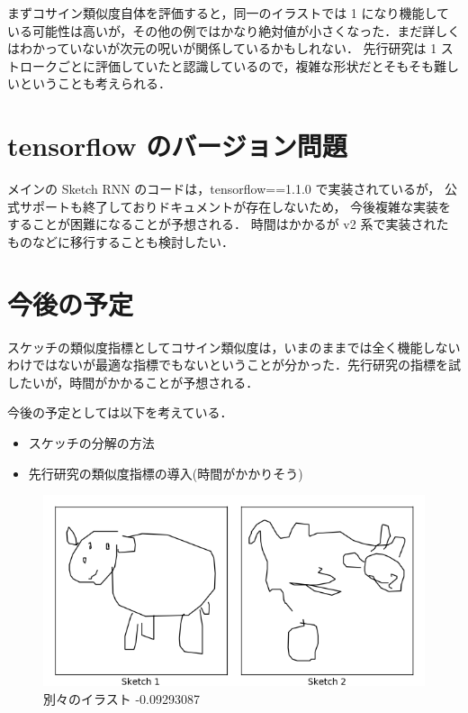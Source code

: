 \documentclass[onecolumn]{ujarticle}   %
\begin{document}
まずコサイン類似度自体を評価すると，同一のイラストでは 1 になり機能している可能性は高いが，その他の例ではかなり絶対値が小さくなった．まだ詳しくはわかっていないが次元の呪いが関係しているかもしれない．
先行研究は 1 ストロークごとに評価していたと認識しているので，複雑な形状だとそもそも難しいということも考えられる．

\section{tensorflow のバージョン問題}
メインの Sketch RNN のコードは，tensorflow==1.1.0 で実装されているが，
公式サポートも終了しておりドキュメントが存在しないため，
今後複雑な実装をすることが困難になることが予想される．
時間はかかるが v2 系で実装されたものなどに移行することも検討したい．

\section{今後の予定}
スケッチの類似度指標としてコサイン類似度は，いまのままでは全く機能しないわけではないが最適な指標でもないということが分かった．先行研究の指標を試したいが，時間がかかることが予想される．

今後の予定としては以下を考えている．
\begin{itemize}
  \item スケッチの分解の方法
  \item 先行研究の類似度指標の導入(時間がかかりそう)
\end{itemize}


\newpage

\begin{figure}[th]
  \begin{center}
    \includegraphics[clip,width=140mm]{compare.png}
    \caption{別々のイラスト -0.09293087}
    \label{fig:result1}
  \end{center}
\end{figure}
\end{document}
